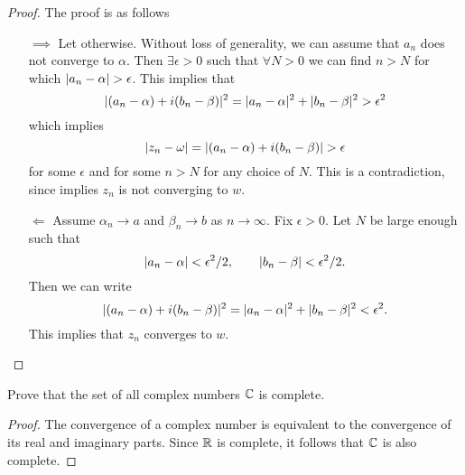 \begin{proof}
	The proof is as follows
	\begin{itemize}
		\item[$\boxed{ \implies }$] Let otherwise. Without loss of generality, we can assume that $ a_n $ does not converge to $ \alpha $. Then $ \exists \epsilon>0 $ such that $ \forall N>0 $ we can find $ n>N $ for which $ |a_n - \alpha| > \epsilon $. This implies that
		\[ |(a_n - \alpha) + i(b_n - \beta)|^2 = |a_n-\alpha|^2 + |b_n - \beta|^2  > \epsilon^2 \]
		which implies
		\[ |z_n - \omega|=|(a_n - \alpha) + i(b_n - \beta)| > \epsilon \]
		for some $ \epsilon $ and for some $ n>N $ for any choice of $ N $. This is a contradiction, since implies $ z_n $ is not converging to $ w $.
		\item[$ \boxed{\Longleftarrow} $] Assume $ \alpha_n \to a $ and $ \beta_n \to b $ as $ n\to \infty $. Fix $ \epsilon>0 $. Let $ N $ be large enough such that 
		\[ |a_n - \alpha|< \epsilon^2/2, \qquad |b_n - \beta|< \epsilon^2/2. \]
		Then we can write
		\[ |(a_n-\alpha) + i(b_n - \beta)|^2 = |a_n-\alpha|^2 + |b_n - \beta|^2 < \epsilon^2. \]
		This implies that $ z_n $ converges to $ w $.
	\end{itemize}
\end{proof}

\begin{problem}[Completeness of $ \C $]
	Prove that the set of all complex numbers $ \C $ is complete.
\end{problem}
\begin{proof}
	The convergence of a complex number is equivalent to the convergence of its real and imaginary parts. Since $ \mathbb{R} $ is complete, it follows that $ \C $ is also complete.
\end{proof}